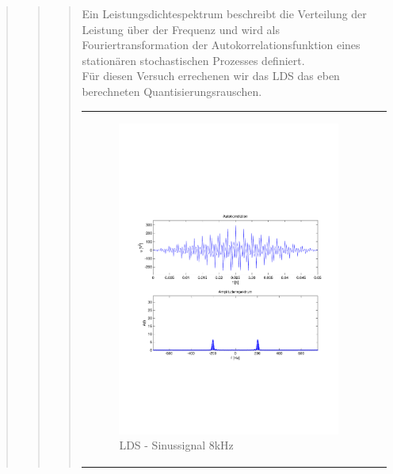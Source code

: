\begin{quote}
\begin{quote}
\begin{quote}
		Ein Leistungsdichtespektrum beschreibt die Verteilung der Leistung über der Frequenz und wird als
		Fouriertransformation der Autokorrelationsfunktion eines stationären stochastischen Prozesses definiert.\cite{LDS}\\
		Für diesen Versuch errechenen wir das LDS das eben berechneten Quantisierungsrauschen. 

        \begin{center}
            \begin{tabular}{ll}
            
            \hspace{-4cm}
                
                \begin{minipage}{0.55\textwidth}
                    \begin{figure}[H]
                        \includegraphics[scale=0.4, trim = 1.5cm 7cm 1.5cm 8cm, clip]
                        {./Bilder/sin8_Quantisierungsfehler_LDS}
                          \caption{LDS - Sinussignal 8kHz}
                    \end{figure}
                \end{minipage}
                              

\end{tabular}
\end{center}
\end{quote}
\end{quote}
\end{quote}
